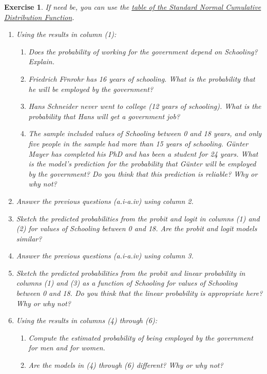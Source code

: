 \documentclass{article}
\newtheorem{exercise}[theorem]{Exercise}
\begin{document}
\begin{exercise}
If need be, you can use the \href{https://engineering.purdue.edu/~reibman/ece302/normal_cdf.pdf}{table of the Standard Normal Cumulative Distribution Function}.
\begin{enumerate}[label=\alph*)]
    \item Using the results in column (1):
        \begin{enumerate}[label=\roman* --]
        \item Does the probability of working for the government depend on Schooling? Explain.
        \item Friedrich F\"rnrohr has 16 years of schooling. What is the probability that he will be employed by the government?
        \item Hans Schneider never went to college (12 years of schooling). What is the probability that Hans will get a government job?
        \item The sample included values of Schooling between 0 and 18 years, and only five people in the sample had more than 15 years of schooling. G\"unter Mayer has completed his PhD and has been a student for 24 years. What is the model's prediction for the probability that G\"unter will be employed by the government? Do you think that this prediction is reliable? Why or why not?
        \end{enumerate}
    \item Answer the previous questions (a.i-a.iv) using column 2.
    \item Sketch the predicted probabilities from the probit and logit in columns (1) and (2) for values of Schooling between 0 and 18. Are the probit and logit models similar?
    \item Answer the previous questions (a.i-a.iv) using column 3.
    \item Sketch the predicted probabilities from the probit and linear probability in columns (1) and (3) as a function of Schooling for values of Schooling between 0 and 18. Do you think that the linear probability is appropriate here? Why or why not?
    \item Using the results in columns (4) through (6):
        \begin{enumerate}[label=\roman* --]
        \item Compute the estimated probability of being employed by the government for men and for women.
        \item Are the models in (4) through (6) different? Why or why not?
        \end{enumerate}

\end{enumerate}
\end{exercise}
\end{document}
